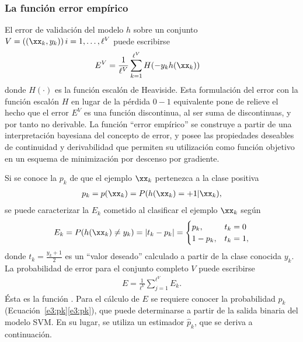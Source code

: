 %
\subsubsection{La función error empírico}
%
El error de validación del modelo $h$ sobre un conjunto
$V=((\xx_k,y_k))\,i=1,\ldots,\ell^V$ puede escribirse
%
\begin{align}
\label{e3:error-test-alt}
  E^V &= \frac{1}{\ell^V}\sum_{k=1}^{\ell^V} H(-{y}_k {h}(\xx_k))
\end{align}
%
donde $H(\cdot)$ es la función escalón de Heaviside.
Esta formulación
del error con la función escalón $H$ en lugar de la pérdida $0-1$
equivalente pone de relieve el hecho que el error $E^V$ es una función
discontinua, al ser suma de discontinuas, y por tanto no derivable.
La función ``error empírico'' \cite{ayat} se construye a partir de una
interpretación bayesiana del concepto de error, y posee las
propiedades deseables de continuidad y derivabilidad que permiten
su utilización como función objetivo en un esquema de minimización por
descenso por gradiente.

Si se conoce la  $p_k$ de que el ejemplo
$\xx_k$ pertenezca a la clase positiva
%
\begin{align}
  \label{e3:pk}
  p_k = p(\xx_k) = P(h(\xx_k)=+1|\xx_k),
\end{align}
%
se puede caracterizar la  $E_k$ cometido al
clasificar el ejemplo $\xx_k$ según
%
\begin{align}
\label{e3:Ek}
  E_k = P(h(\xx_k)\neq y_k) = |t_k-{p}_k| =
  \begin{cases}
    {p}_k, & t_k=0\\ 1-{p}_k, & t_k = 1,
  \end{cases}
\end{align}
%
donde $t_k=\frac{y_k+1}{2}$ es un ``valor deseado'' calculado a partir
de la clase conocida $y_k$. La probabilidad de error para el conjunto
completo $V$ puede escribirse
%
\begin{align}
\label{Err1}
  E = \frac{1}{\ell^V}\sum_{j=1}^{\ell^V} E_k.
\end{align}
%
Ésta es la función .
Para el cálculo de $E$ se requiere conocer la probabilidad $p_k$
(\iflatexml{}Ecuación~\ref{e3:pk}\else\autoref{e3:pk}\fi), que
puede determinarse a partir de la salida binaria del modelo SVM.
En su lugar, se utiliza un estimador $\hat{p}_k$, que se deriva
a continuación.

